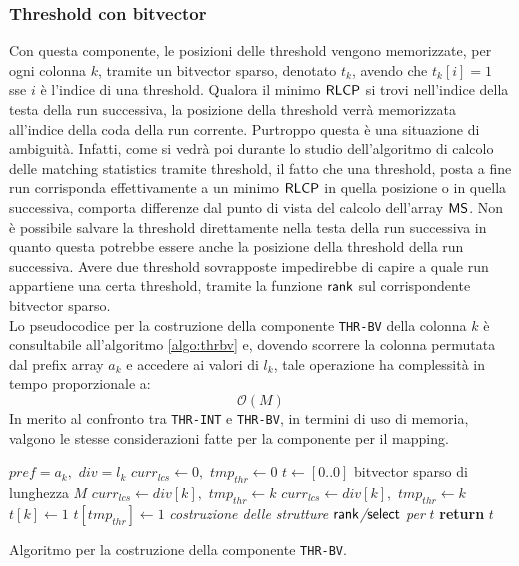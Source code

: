 \subsubsection{Threshold con bitvector}
Con questa componente, le posizioni delle threshold vengono
memorizzate, per ogni colonna $k$, tramite un bitvector sparso, denotato
$t_k$, avendo che $t_k[i]=1$ sse $i$ è l'indice di una threshold.
Qualora il minimo $\mbox{\rm {\sf RLCP}}$ si trovi nell'indice della testa della run
successiva, la posizione della threshold verrà memorizzata all'indice
della coda della run corrente. Purtroppo questa è una situazione di ambiguità.
Infatti, come si vedrà poi durante lo studio dell'algoritmo di calcolo delle
matching statistics tramite threshold, il fatto che una threshold, posta a fine
run corrisponda effettivamente a un minimo $\mbox{\rm {\sf RLCP}}$ in quella posizione o in
quella successiva, comporta differenze dal punto di vista del calcolo dell'array
$\mbox{\rm {\sf MS}}$. 
Non è possibile salvare la threshold direttamente nella testa della
run successiva in quanto questa potrebbe essere anche la posizione della
threshold della run successiva. Avere due threshold sovrapposte impedirebbe di
capire a quale run appartiene una certa threshold, tramite la funzione
$\mbox{\rm {\sf rank}}$ sul corrispondente bitvector sparso. \\
Lo pseudocodice per la costruzione della componente
\texttt{THR-BV} della colonna $k$ è consultabile all'algoritmo \ref{algo:thrbv}
e, dovendo scorrere la colonna permutata dal prefix array $a_k$ e
accedere ai valori di $l_k$, tale operazione ha complessità in tempo
proporzionale a:
\begin{equation}
  \label{eq:thrbv}
  \mathcal{O}(M)
\end{equation}
\noindent
In merito al confronto tra \texttt{THR-INT} e \texttt{THR-BV}, in termini di uso
di memoria, valgono le stesse considerazioni fatte per la componente per il
mapping. 
\begin{algorithm}
  \begin{algorithmic}
    \Comment $pref=a_k,\,\,div=l_k$
    \State $curr_{lcs}\gets 0,\,\,tmp_{thr}\gets 0$
    \State $t\gets[0..0]$
    \Comment bitvector sparso di lunghezza $M$
    \For {\textit{every} $k\in\left[0,\,\, M\right)$}
    \State $curr_{lcs}\gets div[k],\,\,tmp_{thr}\gets k$
    \EndIf
    \State $curr_{lcs}\gets div[k],\,\,tmp_{thr}\gets k$
    \EndIf
    \State $t[k]\gets 1$
    \Else
    \State $t[tmp_{thr}]\gets 1$
    \EndIf
    \EndIf
    \EndFor
    \State \textit{costruzione delle strutture $\mbox{\rm {\sf rank}}$/$\mbox{\rm {\sf select}}$ per} $t$
    \State \textbf{return} $t$  
    \EndFunction
  \end{algorithmic}
  \caption{Algoritmo per la costruzione della componente \texttt{THR-BV}.}
  \label{algo:thrbv}
\end{algorithm}
